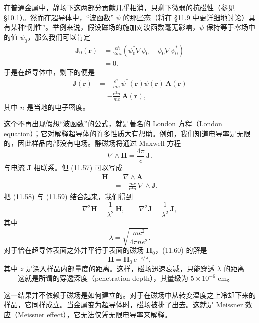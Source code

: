 在普通金属中，静场下这两部分贡献几乎相消，只剩下微弱的抗磁性（参见 §10.1）。然而在超导体中，“波函数” $\psi$ 的那些态（将在 §11.9 中更详细地讨论）具有某种“刚性”。举例来说，假设磁场的施加对波函数毫无影响，$\psi$ 保持等于零场中的值 $\psi_0$，那么我们可以肯定
\begin{align*}
\mathbf{J}_0(\mathbf{r}) &= \frac{e\hbar}{2mi}\left(\psi_0^{*}\nabla\psi_0 - \psi_0\nabla\psi_0^{*}\right)\\
&= 0. \tag{11.56}
\end{align*}
于是在超导体中，剩下的便是
\begin{align*}
\mathbf{J}(\mathbf{r}) &= -\frac{e^{2}}{mc}\,\psi^{*}(\mathbf{r})\psi(\mathbf{r})\,\mathbf{A}(\mathbf{r})\\
&= -\frac{e^{2}n}{mc}\,\mathbf{A}(\mathbf{r}), \tag{11.57}
\end{align*}
其中 $n$ 是当地的电子密度。

这个不再出现假想“波函数”的公式，就是著名的 London 方程（London equation）；它对解释超导体的许多性质大有帮助。例如，我们知道电导率是无限的，因此样品内部没有电场。静磁场将通过 Maxwell 方程
\begin{equation*}
\nabla\wedge\mathbf{H} = \frac{4\pi}{c}\,\mathbf{J}. \tag{11.58}
\end{equation*}
与电流 $\mathbf{J}$ 相联系。但 (11.57) 可以写成
\begin{align*}
\mathbf{H} &= \nabla\wedge\mathbf{A}\\
&= -\frac{mc}{e^{2}n}\,\nabla\wedge\mathbf{J}. \tag{11.59}
\end{align*}
把 (11.58) 与 (11.59) 结合起来，我们得到
\begin{equation*}
\nabla^{2}\mathbf{H} = \frac{1}{\lambda^{2}}\,\mathbf{H}, \qquad \nabla^{2}\mathbf{J} = \frac{1}{\lambda^{2}}\,\mathbf{J}, \tag{11.60}
\end{equation*}
其中
\begin{equation*}
\lambda = \sqrt{\frac{mc^{2}}{4\pi ne^{2}}}. \tag{11.61}
\end{equation*}
对于恰在超导体表面之外并平行于表面的磁场 $\mathbf{H}_0$，(11.60) 的解是
\begin{equation*}
\mathbf{H} = \mathbf{H}_0\,e^{-z/\lambda}, \tag{11.62}
\end{equation*}
其中 $z$ 是深入样品内部量度的距离。这样，磁场迅速衰减，只能穿透 $\lambda$ 的距离——这就是所谓的穿透深度（penetration depth），其量级为 $5\times10^{-6}$ cm。

这一结果并不依赖于磁场是如何建立的。对于在磁场中从转变温度之上冷却下来的样品，它同样成立。当金属变为超导体时，磁场被排了出去。这就是 Meissner 效应（Meissner effect），它无法仅凭无限电导率来解释。

